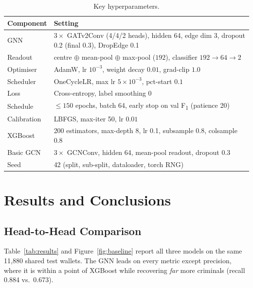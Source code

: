 \documentclass[12pt,a4paper,openany]{report}
\begin{document}
\begin{table}[H]
\centering\small
\caption{Key hyperparameters.}
\label{tab:hparams}
\begin{tabularx}{\linewidth}{l Y}
\toprule
\textbf{Component} & \textbf{Setting} \\
\midrule
GNN         & $3\times$ GATv2Conv (4/4/2 heads), hidden 64, edge dim 3, dropout 0.2 (final 0.3), DropEdge 0.1 \\
Readout     & centre $\oplus$ mean-pool $\oplus$ max-pool ($192$), classifier $192\!\to\!64\!\to\!2$ \\
Optimiser   & AdamW, lr $10^{-3}$, weight decay $0.01$, grad-clip $1.0$ \\
Scheduler   & OneCycleLR, max lr $5\times10^{-3}$, pct-start $0.1$ \\
Loss        & Cross-entropy, label smoothing $0$ \\
Schedule    & $\le 150$ epochs, batch 64, early stop on val F\textsubscript{1} (patience 20) \\
Calibration & LBFGS, max-iter 50, lr $0.01$ \\
XGBoost     & 200 estimators, max-depth 8, lr 0.1, subsample 0.8, colsample 0.8 \\
Basic GCN   & $3\times$ GCNConv, hidden 64, mean-pool readout, dropout 0.3 \\
Seed        & 42 (split, sub-split, dataloader, torch RNG) \\
\bottomrule
\end{tabularx}
\end{table}

\chapter{Results and Conclusions}\label{ch:results}

\section{Head-to-Head Comparison}
Table~\ref{tab:results} and Figure~\ref{fig:baseline} report all three models on the same
11{,}880 shared test wallets. The GNN leads on every metric except precision, where it is within
a point of XGBoost while recovering \emph{far} more criminals (recall 0.884 vs.\ 0.673).
\end{document}
